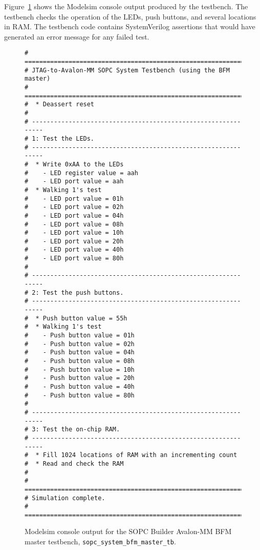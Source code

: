 \documentclass[10pt,twoside]{article}
\begin{document}
Figure~\ref{fig:sopc_system_bfm_master_tb} shows the Modelsim console
output produced by the testbench. The testbench checks the operation of the
LEDs, push buttons, and several locations in RAM. The testbench code
contains SystemVerilog assertions that would have generated an error
message for any failed test.


\begin{figure}
\begin{center}
\begin{minipage}{0.8\textwidth}
\begin{verbatim}
# ==============================================================
# JTAG-to-Avalon-MM SOPC System Testbench (using the BFM master)
# ==============================================================
#  * Deassert reset
# 
# --------------------------------------------------------------
# 1: Test the LEDs.
# --------------------------------------------------------------
#  * Write 0xAA to the LEDs
#    - LED register value = aah
#    - LED port value = aah
#  * Walking 1's test
#    - LED port value = 01h
#    - LED port value = 02h
#    - LED port value = 04h
#    - LED port value = 08h
#    - LED port value = 10h
#    - LED port value = 20h
#    - LED port value = 40h
#    - LED port value = 80h
# 
# --------------------------------------------------------------
# 2: Test the push buttons.
# --------------------------------------------------------------
#  * Push button value = 55h
#  * Walking 1's test
#    - Push button value = 01h
#    - Push button value = 02h
#    - Push button value = 04h
#    - Push button value = 08h
#    - Push button value = 10h
#    - Push button value = 20h
#    - Push button value = 40h
#    - Push button value = 80h
# 
# --------------------------------------------------------------
# 3: Test the on-chip RAM.
# --------------------------------------------------------------
#  * Fill 1024 locations of RAM with an incrementing count
#  * Read and check the RAM
# 
# ==============================================================
# Simulation complete.
# ==============================================================
\end{verbatim}
\end{minipage}
\end{center}
  \caption{Modelsim console output for the SOPC Builder
  Avalon-MM BFM master testbench,
  {\tt sopc\_system\_bfm\_master\_tb}.}
  \label{fig:sopc_system_bfm_master_tb}
\end{figure}

\clearpage
\end{document}
